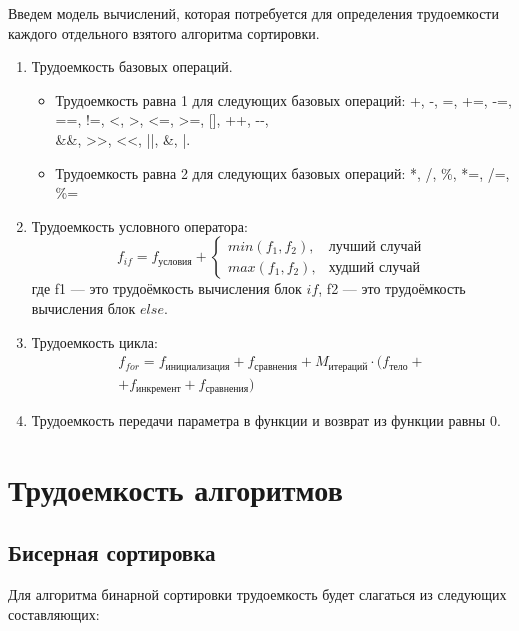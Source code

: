 Введем модель вычислений, которая потребуется для определения трудоемкости каждого отдельного взятого алгоритма сортировки.
\begin{enumerate}[label={\arabic*)}]
	\item Трудоемкость базовых операций.
	\begin{itemize}[label=---]
		\item Трудоемкость равна 1 для следующих базовых операций: +, -, =, +=, -=, ==, !=, <, >, <=, >=, [], ++, {-}-,\\
		\&\&, >>, <<, ||, \&, |.
		\item Трудоемкость равна 2 для следующих базовых операций: *, /, \%, *=, /=, \%=
	\end{itemize}
	\item Трудоемкость условного оператора:
	\begin{equation}
		\label{for:if}
		f_{if} = f_{\text{условия}} + 
		\begin{cases}
			min(f_1, f_2), & \text{лучший случай}\\
			max(f_1, f_2), & \text{худший случай}
		\end{cases}
	\end{equation}
	где f1 --- это трудоёмкость вычисления блок $if$, f2 --- это трудоёмкость вычисления блок $else$.
	\clearpage
	\item Трудоемкость цикла:
	\begin{equation}
		\label{for:for}
		\begin{gathered}
			f_{for} = f_{\text{инициализация}} + f_{\text{сравнения}} + M_{\text{итераций}} \cdot (f_{\text{тело}} +\\
			+ f_{\text{инкремент}} + f_{\text{сравнения}})
		\end{gathered}
	\end{equation}
	\item Трудоемкость передачи параметра в функции и возврат из функции равны 0.
\end{enumerate}

\section{Трудоемкость алгоритмов}
\subsection{Бисерная сортировка}
Для алгоритма бинарной сортировки трудоемкость будет слагаться из следующих составляющих:

